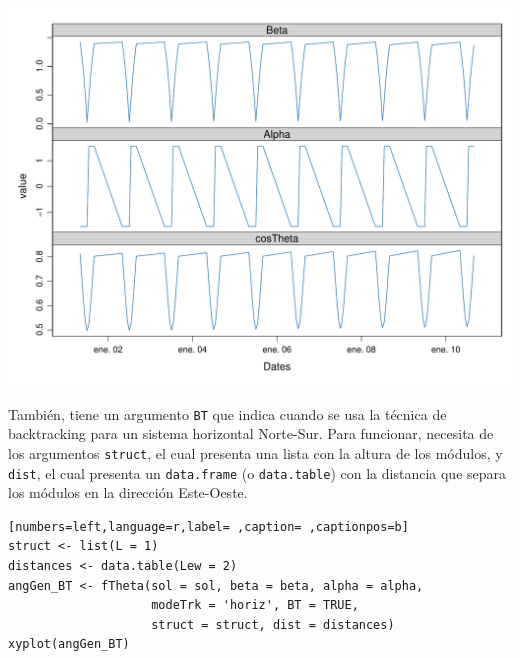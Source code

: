 \begin{itemize}
\begin{center}
\includegraphics[width=\textwidth]{figuras/codigo-fthetahoriz.pdf}
\end{center}
También, tiene un argumento \texttt{BT} que indica cuando se usa la técnica de backtracking para un sistema horizontal Norte-Sur. Para funcionar, necesita de los argumentos \texttt{struct}, el cual presenta una lista con la altura de los módulos, y \texttt{dist}, el cual presenta un \texttt{data.frame} (o \texttt{data.table}) con la distancia que separa los módulos en la dirección Este-Oeste.
\begin{lstlisting}[numbers=left,language=r,label= ,caption= ,captionpos=b]
struct <- list(L = 1)
distances <- data.table(Lew = 2)
angGen_BT <- fTheta(sol = sol, beta = beta, alpha = alpha,
                    modeTrk = 'horiz', BT = TRUE,
                    struct = struct, dist = distances)
xyplot(angGen_BT)
\end{lstlisting}


\end{itemize}
